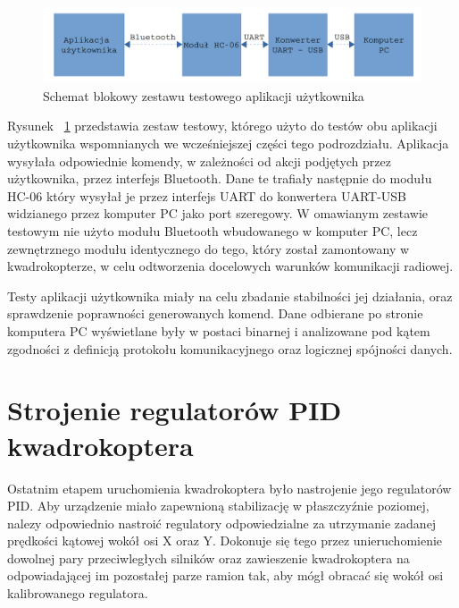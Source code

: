\begin{figure}[H]
	\centering
	\includegraphics[scale=0.2]{Pictures/TestyAplikacji.png}
	\caption[Schemat blokowy zestawu testowego aplikacji użytkownika]{Schemat blokowy zestawu testowego aplikacji użytkownika}
	\label{fig:UserAplication_test}
\end{figure}

Rysunek ~\ref{fig:UserAplication_test} przedstawia zestaw testowy, którego użyto do testów obu aplikacji użytkownika wspomnianych we wcześniejszej części tego podrozdziału. Aplikacja wysyłała odpowiednie komendy, w zależności od akcji podjętych przez użytkownika, przez interfejs Bluetooth. Dane te trafiały następnie do modułu HC-06 który wysyłał je przez interfejs UART do konwertera UART-USB widzianego przez komputer PC jako port szeregowy. W omawianym zestawie testowym nie użyto modułu Bluetooth wbudowanego w komputer PC, lecz zewnętrznego modułu identycznego do tego, który został zamontowany w kwadrokopterze, w celu odtworzenia docelowych warunków komunikacji radiowej. 

Testy aplikacji użytkownika miały na celu zbadanie stabilności jej działania, oraz sprawdzenie poprawności generowanych komend. Dane odbierane po stronie komputera PC wyświetlane były w postaci binarnej i analizowane pod kątem zgodności z definicją protokołu komunikacyjnego oraz logicznej spójności danych.

\section{Strojenie regulatorów PID kwadrokoptera}

Ostatnim etapem uruchomienia kwadrokoptera było nastrojenie jego regulatorów PID. Aby urządzenie miało zapewnioną stabilizację w płaszczyźnie poziomej, nalezy odpowiednio nastroić regulatory odpowiedzialne za utrzymanie zadanej prędkości kątowej wokół osi X oraz Y. Dokonuje się tego przez unieruchomienie dowolnej pary przeciwległych silników oraz zawieszenie kwadrokoptera na odpowiadającej im pozostałej parze ramion tak, aby mógł obracać się wokół osi kalibrowanego regulatora.

